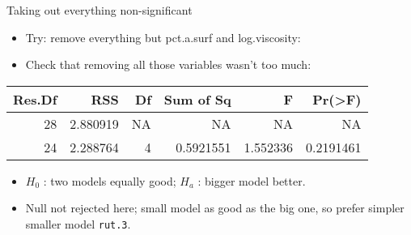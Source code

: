 \begin{frame}[fragile]{Taking out everything non-significant}
\protect\hypertarget{taking-out-everything-non-significant}{}
\begin{itemize}
\tightlist
\item
  Try: remove everything but pct.a.surf and log.viscosity:
\end{itemize}

\footnotesize

\begin{Shaded}
\begin{Highlighting}[]
\NormalTok{ \textless{}{-}}\StringTok{ }\NormalTok{(}\OperatorTok{\textasciitilde{}}\StringTok{ }\OperatorTok{+}\StringTok{ }
\end{Highlighting}
\end{Shaded}

\normalsize

\footnotesize

\begin{itemize}
\tightlist
\item
  Check that removing all those variables wasn't too much:
\end{itemize}

\begin{Shaded}
\begin{Highlighting}[]
\NormalTok{)}
\end{Highlighting}
\end{Shaded}

\begin{longtable}[]{@{}rrrrrr@{}}
\toprule
Res.Df & RSS & Df & Sum of Sq & F & Pr(\textgreater F)\tabularnewline
\midrule
\endhead
28 & 2.880919 & NA & NA & NA & NA\tabularnewline
24 & 2.288764 & 4 & 0.5921551 & 1.552336 & 0.2191461\tabularnewline
\bottomrule
\end{longtable}

\normalsize

\begin{itemize}
\tightlist
\item
  \(H_0\) : two models equally good; \(H_a\) : bigger model better.
\item
  Null not rejected here; small model as good as the big one, so prefer
  simpler smaller model \texttt{rut.3}.
\end{itemize}
\end{frame}

